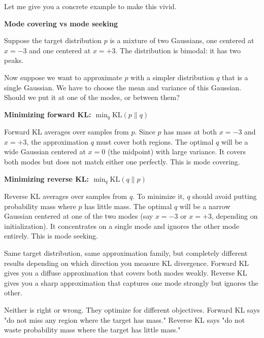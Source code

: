 Let me give you a concrete example to make this vivid.

\vspace{1.5em}

\begin{examplebox}
\textbf{Mode covering vs mode seeking}

\vspace{0.5em}

Suppose the target distribution $p$ is a mixture of two Gaussians, one centered at $x = -3$ and one centered at $x = +3$. The distribution is bimodal: it has two peaks.

\vspace{0.5em}

Now suppose we want to approximate $p$ with a simpler distribution $q$ that is a single Gaussian. We have to choose the mean and variance of this Gaussian. Should we put it at one of the modes, or between them?

\vspace{0.5em}

\textbf{Minimizing forward KL: $\min_q \text{KL}(p \| q)$}

Forward KL averages over samples from $p$. Since $p$ has mass at both $x = -3$ and $x = +3$, the approximation $q$ must cover both regions. The optimal $q$ will be a wide Gaussian centered at $x = 0$ (the midpoint) with large variance. It covers both modes but does not match either one perfectly. This is mode covering.

\vspace{0.5em}

\textbf{Minimizing reverse KL: $\min_q \text{KL}(q \| p)$}

Reverse KL averages over samples from $q$. To minimize it, $q$ should avoid putting probability mass where $p$ has little mass. The optimal $q$ will be a narrow Gaussian centered at one of the two modes (say $x = -3$ or $x = +3$, depending on initialization). It concentrates on a single mode and ignores the other mode entirely. This is mode seeking.

\vspace{0.5em}

Same target distribution, same approximation family, but completely different results depending on which direction you measure KL divergence. Forward KL gives you a diffuse approximation that covers both modes weakly. Reverse KL gives you a sharp approximation that captures one mode strongly but ignores the other.

\vspace{0.5em}

Neither is right or wrong. They optimize for different objectives. Forward KL says "do not miss any region where the target has mass." Reverse KL says "do not waste probability mass where the target has little mass."
\end{examplebox}

